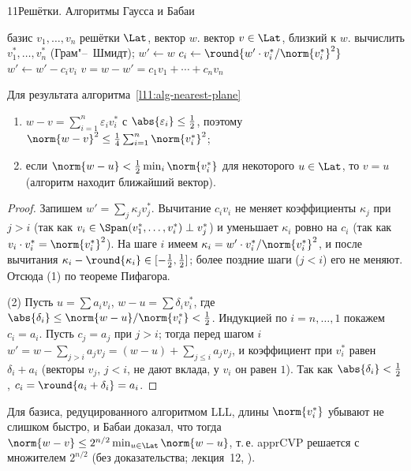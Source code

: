 \begin{lecture}{11}{Решётки. Алгоритмы Гаусса и Бабаи}
\begin{algorithm}\label{l11:alg-nearest-plane}
\begin{algorithmic}[1]
\Require базис $v_1, \dots, v_n$ решётки $\Lat$, вектор $w$.
\Ensure вектор $v \in \Lat$, близкий к $w$.
\State вычислить $v_1^*, \dots, v_n^*$ (Грам"--~Шмидт); $w' \gets w$
  \State $c_i \gets \round{w' \cdot v_i^* / \norm{v_i^*}^2}$
  \State $w' \gets w' - c_i v_i$
\EndFor
\State \Return $v = w - w' = c_1 v_1 + \cdots + c_n v_n$
\end{algorithmic}
\end{algorithm}

\begin{proposition}\label{l11:nearest-plane}
Для результата алгоритма~\ref{l11:alg-nearest-plane}
\begin{enumerate}
  \item $w - v = \sum_{i=1}^n \varepsilon_i v_i^*$ с $\abs{\varepsilon_i} \le \frac12$, поэтому
    $\norm{w - v}^2 \le \frac14 \sum_{i=1}^n \norm{v_i^*}^2$;
  \item если $\norm{w - u} < \frac12 \min_i \norm{v_i^*}$ для некоторого $u \in \Lat$, то $v = u$
    (алгоритм находит ближайший вектор).
\end{enumerate}
\end{proposition}

\begin{proof}
Запишем $w' = \sum_j \kappa_j v_j^*$. Вычитание $c_i v_i$ не меняет коэффициенты $\kappa_j$ при
$j > i$ (так как $v_i \in \Span(v_1^*, \dots, v_i^*) \perp v_j^*$) и уменьшает $\kappa_i$ ровно на
$c_i$ (так как $v_i \cdot v_i^* = \norm{v_i^*}^2$). На шаге $i$ имеем $\kappa_i = w' \cdot v_i^* /
\norm{v_i^*}^2$, и после вычитания $\kappa_i - \round{\kappa_i} \in [-\frac12, \frac12]$; более
поздние шаги ($j < i$) его не меняют. Отсюда (1) по теореме Пифагора.

(2) Пусть $u = \sum a_i v_i$, $w - u = \sum \delta_i v_i^*$, где
$\abs{\delta_i} \le \norm{w - u}/\norm{v_i^*} < \frac12$. Индукцией по $i = n, \dots, 1$ покажем
$c_i = a_i$. Пусть $c_j = a_j$ при $j > i$; тогда перед шагом $i$
$w' = w - \sum_{j > i} a_j v_j = (w - u) + \sum_{j \le i} a_j v_j$, и коэффициент при $v_i^*$ равен
$\delta_i + a_i$ (векторы $v_j$, $j < i$, не дают вклада, у $v_i$ он равен $1$). Так как
$\abs{\delta_i} < \frac12$, $c_i = \round{a_i + \delta_i} = a_i$.
\end{proof}

Для базиса, редуцированного алгоритмом LLL, длины $\norm{v_i^*}$ убывают не слишком быстро,
и Бабаи доказал, что тогда $\norm{w - v} \le 2^{n/2} \min_{u \in \Lat}\norm{w - u}$, т.\,е.
apprCVP решается с множителем $2^{n/2}$ (без доказательства; лекция~12, \cite{babai}).


\end{lecture}
